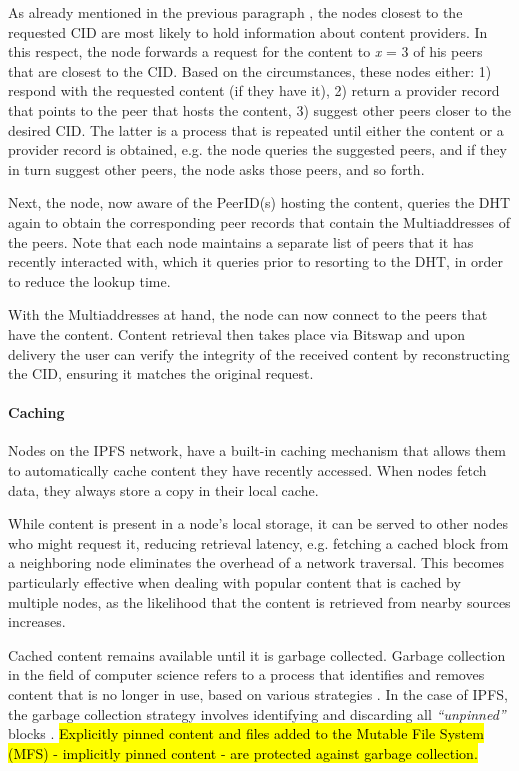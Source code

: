 As already mentioned in the previous paragraph , the nodes closest to the requested CID are most likely to hold information about content providers. In this respect, the node forwards a request for the content to \textit{x} = 3 of his peers that are closest to the CID. Based on the circumstances, these nodes either: 1) respond with the requested content (if they have it), 2) return a provider record that points to the peer that hosts the content, 3) suggest other peers closer to the desired CID. The latter is a process that is repeated until either the content or a provider record is obtained, e.g. the node queries the suggested peers, and if they in turn suggest other peers, the node asks those peers, and so forth.

Next, the node, now aware of the PeerID(s) hosting the content, queries the DHT again to obtain the corresponding peer records that contain the Multiaddresses of the peers. Note that each node maintains a separate list of peers that it has recently interacted with, which it queries prior to resorting to the DHT, in order to reduce the lookup time.

With the Multiaddresses at hand, the node can now connect to the peers that have the content. Content retrieval then takes place via Bitswap and upon delivery the user can verify the integrity of the received content by reconstructing the CID, ensuring it matches the original request.

\paragraph{Caching}\label{par:caching_ipfs}
Nodes on the IPFS network, have a built-in caching mechanism that allows them to automatically cache content they have recently accessed. When nodes fetch data, they always store a copy in their local cache.

While content is present in a node's local storage, it can be served to other nodes who might request it, reducing retrieval latency, e.g. fetching a cached block from a neighboring node eliminates the overhead of a network traversal. This becomes particularly effective when dealing with popular content that is cached by multiple nodes, as the likelihood that the content is retrieved from nearby sources increases.

Cached content remains available until it is garbage collected. Garbage collection in the field of computer science refers to a process that identifies and removes content that is no longer in use, based on various strategies \citep{gc_2023}. In the case of IPFS, the garbage collection strategy involves identifying and discarding all \emph{``unpinned''} blocks \citep{ipfs_docs_2}. \hl{Explicitly pinned content and files added to the Mutable File System (MFS) - implicitly pinned content - are protected against garbage collection.}

